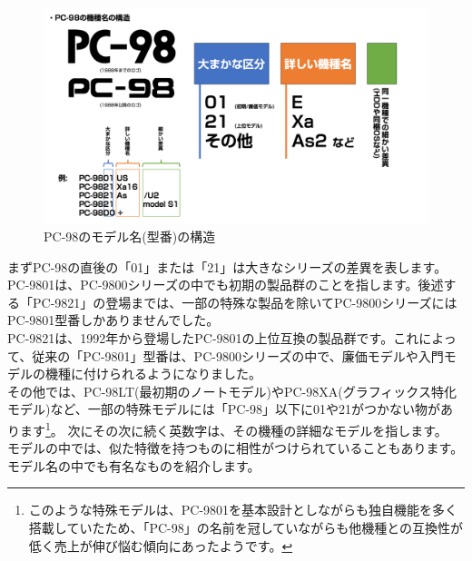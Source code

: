 \documentclass[b5paper,9pt,platex,dvipdfmx]{jsarticle}
\begin{document}
\begin{figure}[H]
  \centering
  \includegraphics[width=11.5cm]{img-2.png}
  \caption{PC-98のモデル名(型番)の構造}
\end{figure}
\begin{multicols}{3}
まずPC-98の直後の「01」または「21」は大きなシリーズの差異を表します。\\
PC-9801は、PC-9800シリーズの中でも初期の製品群のことを指します。後述する「PC-9821」の登場までは、一部の特殊な製品を除いてPC-9800シリーズにはPC-9801型番しかありませんでした。\\
PC-9821は、1992年から登場したPC-9801の上位互換の製品群です。これによって、従来の「PC-9801」型番は、PC-9800シリーズの中で、廉価モデルや入門モデルの機種に付けられるようになりました。\\
その他では、PC-98LT(最初期のノートモデル)やPC-98XA(グラフィックス特化モデル)など、一部の特殊モデルには「PC-98」以下に01や21がつかない物があります\footnote{このような特殊モデルは、PC-9801を基本設計としながらも独自機能を多く搭載していたため、「PC-98」の名前を冠していながらも他機種との互換性が低く売上が伸び悩む傾向にあったようです。}。
次にその次に続く英数字は、その機種の詳細なモデルを指します。\\
モデルの中では、似た特徴を持つものに相性がつけられていることもあります。\\
モデル名の中でも有名なものを紹介します。\\

\end{multicols}
\end{document}
